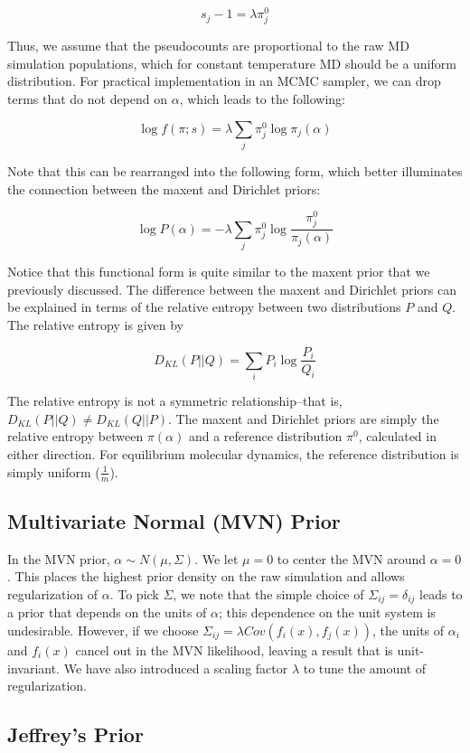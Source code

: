 \documentclass[12pt]{article}
\begin{document}
$$s_j - 1 = \lambda \pi_j^0$$

Thus, we assume that the pseudocounts are proportional to the raw MD simulation populations, which for constant temperature MD should be a uniform distribution.  For practical implementation in an MCMC sampler, we can drop terms that do not depend on $\alpha$, which leads to the following:

$$\log f(\pi;s) =  \lambda \sum_j \pi_j^0 \log \pi_j(\alpha)$$

Note that this can be rearranged into the following form, which better illuminates the connection between the maxent and Dirichlet priors:

$$\log P(\alpha) = -\lambda \sum_j \pi_j^0 \log \frac{\pi_j^0}{\pi_j(\alpha)}$$

Notice that this functional form is quite similar to the maxent prior that we previously discussed.  The difference between the maxent and Dirichlet priors can be explained in terms of the relative entropy between two distributions $P$ and $Q$.  The relative entropy is given by

$$D_{KL}(P||Q) = \sum_i P_i \log \frac{P_i}{Q_i}$$

The relative entropy is not a symmetric relationship--that is, $D_{KL}(P||Q) \ne D_{KL}(Q||P)$.  The maxent and Dirichlet priors are simply the relative entropy between $\pi(\alpha)$ and a reference distribution $\pi^0$, calculated in either direction.    For equilibrium molecular dynamics, the reference distribution is simply uniform ($\frac{1}{m}$).


\subsection*{Multivariate Normal (MVN) Prior}

In the MVN prior, $\alpha \sim N(\mu,\Sigma)$.  We let $\mu = 0$ to center the MVN around $\alpha = 0$.  This places the highest prior density on the raw simulation and allows regularization of $\alpha$.  To pick $\Sigma$, we note that the simple choice of $\Sigma_{ij} = \delta_{ij}$ leads to a prior that depends on the units of $\alpha$; this dependence on the unit system is undesirable.  However, if we choose $\Sigma_{ij} = \lambda Cov(f_i(x), f_j(x))$, the units of $\alpha_i$ and $f_i(x)$ cancel out in the MVN likelihood, leaving a result that is unit-invariant.  We have also introduced a scaling factor $\lambda$ to tune the amount of regularization.


\subsection*{Jeffrey's Prior}
\end{document}
